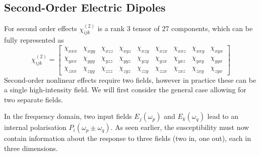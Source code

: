 \subsection{Second-Order Electric Dipoles}\label{sec:background:NonlinearOptics:shgP}
For second order effects $\chi^{(2)}_{ijk}$ is a rank 3 tensor of 27 components, which can be fully represented as
\begin{equation}\label{eq:background:NonlinearOptics:shgP:chiFull}
	\chi^{(2)}_{ijk} =
	\begin{bmatrix}
		\chi_{xxx} & \chi_{xyy} & \chi_{xzz} & \chi_{xyz} & \chi_{xzy} & \chi_{xzx} & \chi_{xxz} & \chi_{xxy} & \chi_{xyx}\\ 
		\chi_{yxx} & \chi_{yyy} & \chi_{yzz} & \chi_{yyz} & \chi_{yzy} & \chi_{yzx} & \chi_{yxz} & \chi_{yxy} & \chi_{yyx}\\ 
		\chi_{zxx} & \chi_{zyy} & \chi_{zzz} & \chi_{zyz} & \chi_{zzy} & \chi_{zzx} & \chi_{zxz} & \chi_{zxy} & \chi_{zyx}
	\end{bmatrix}
\end{equation}
Second-order nonlinear effects require two fields, however in practice these can be a single high-intensity field. We will first consider the general case allowing for two separate fields.

In the frequency domain, two input fields $E_{j}(\omega_{p} )$ and $E_{k}(\omega_{q} )$ lead to an internal polarisation $P_{i}(\omega_{p}\pm\omega_{q} )$. As seen earlier, the susceptibility must now contain information about the response to three fields (two in, one out), each in three dimensions. 


